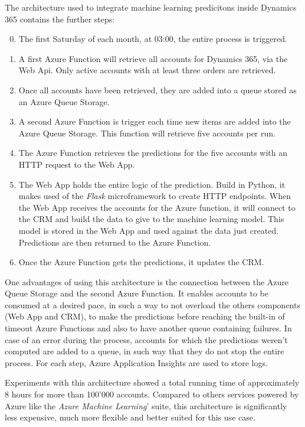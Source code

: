 \noindent The architecture used to integrate machine learning predicitons inside Dynamics 365 contains the further steps:
\vspace*{-\baselineskip}
\begin{enumerate}[label=\texttt{\arabic*.}]
    \setcounter{enumi}{-1}
    \item The first Saturday of each month, at 03:00, the entire process is triggered.
    \item A first Azure Function will retrieve all accounts for Dynamics 365, via the Web Api. Only active accounts with at least three orders are retrieved.
    \item Once all accounts have been retrieved, they are added into a queue stored as an Azure Queue Storage.
    \item A second Azure Function is trigger each time new items are added into the Azure Queue Storage. This function will retrieve five accounts per run.
    \item The Azure Function retrieves the predictions for the five accounts with an HTTP request to the Web App.
    \item The Web App holds the entire logic of the prediction. Build in Python, it makes used of the \textit{Flask} microframework to create HTTP endpoints. When the Web App receives the accounts for the Azure function, it will connect to the CRM and build the data to give to the machine learning model. This model is stored in the Web App and used against the data just created. Predictions are then returned to the Azure Function.
    \item Once the Azure Function gets the predictions, it updates the CRM.
\end{enumerate}

One advantages of using this architecture is the connection between the Azure Queue Storage and the second Azure Function. It enables accounts to be consumed at a desired pace, in such a way to not overload the others components (Web App and CRM), to make the predictions before reaching the built-in of timeout Azure Functions and also to have another queue containing failures. In case of an error during the process, accounts for which the predictions weren't computed are added to a queue, in such way that they do not stop the entire process. For each step, Azure Application Insights are used to store logs.

Experiments with this architecture showed a total running time of approximately 8 hours for more than 100'000 accounts. Compared to others services powered by Azure like the \textit{Azure Machine Learning}' suite, this architecture is significantly less expensive, much more flexible and better suited for this use case.

